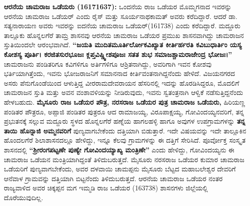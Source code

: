 \textbf{ ಆರನೆಯ ಚಾಮರಾಜ ಒಡೆಯರು (16171637): } ಒಂದನೆಯ ರಾಜ ಒಡೆಯರ ಮೊಮ್ಮಗನಾದ ಇವರನ್ನು ಆರನೆಯ ಚಾಮರಾಜ ಒಡೆಯರ್​ ಎಂದು ರೈಸ್​ ಮತ್ತು ಸೂರ್ಯನಾಥಕಾಮತ್​ ಅವರು ಕರೆದಿದ್ದಾರೆ. ಆದರೆ ಡಾ. ಸತ್ಯನಾರಾಯಣ ಅವರು ಇವರನ್ನು ಐದನೆಯ ಚಾಮರಾಜ ಒಡೆಯರ್​(161738) ಎಂದು ಕರೆದಿದ್ದಾರೆ. ಮದ್ದೂರು ತಾಲ್ಲೂಕು ಹೊನ್ನಲಗೆರೆ ತಾಮ್ರ ಶಾಸನವು ಆರನೆಯ ಚಾಮರಾಜ ಒಡೆಯರ ಪ್ರಮುಖ ಶಾಸನವಾಗಿದ್ದು ಚಾಮರಾಜನ ಸ್ತುತಿಯಿಂದಲೇ ಆರಂಭವಾಗಿದೆ. \textbf{“ಜಯತಿ ಮುದಿತಮೂರ್ತಿರ್ಲೋಕವಿಖ್ಯಾತ ಕೀರ್ತಿರ್ಹರತಿ ಕವಿಬುಧಾರ್ತಿಂ ಯಸ್ಯ ಕೋಶಸ್ಯ ಪೂರ್ತಿ। ಕರಜಿತಸುರಭೂಜಃ ಕ್ಲಪ್ತವಿಷ್ಣ್ವೀಶಪೂಜಃ ಸತತ ಶುಭ ಸಮಾಜಶ್ಚಾಮರಾಜೇಂದ್ರ ಭೋಜಃ।”} ಚಾಮರಾಜನು ಪಂಡಿತರಿಗೂ ಕವಿಗಳಿಗೂ ಅರ್ತಿಗಳಿಗೂ ಆಶ್ರಿತನಾಗಿದ್ದು, ಅವರಿಗಾಗಿ ಇವನ ಕೋಶವು ಭರ್ತಿಯಾಗಿತ್ತೆಂದು, ಇವನು ಭೋಜರಾಜನಿಗೆ ಸಮಾನನಾದ ಕೀರ್ತಿವಂತನಾಗಿದ್ದನೆಂದು ಹೇಳಿದೆ. ವಿಜಯನಗರದ ಅಸರು ಪೆನುಗೊಂಡೆಯಿಂದ ಆಳುತ್ತಿದ್ದ ವೀರರಾಮದೇವರಾಯನ ಹೆಸರಿನಲ್ಲಿ ಇದನ್ನು ಹೊರಡಿಸಿದ್ದರೂ, ಮೊದಲಿಗೆ ಚಾಮರಾಜನ ಸ್ತುತಿ ಮತ್ತು ಅವನ ವಂಶಾವಳಿಯನ್ನು ನೀಡಿರುವುದು, ಇವನು ಸ್ವತಂತ್ರನಾಗಿ ಆಳ್ವಿಕೆ ನಡೆಸುತ್ತಿದ್ದನೆಂದು ಹೇಳಬಹುದು. \textbf{ಮೈಸೂರು ರಾಜ ಒಡೆಯರ ಪೌತ್ರ, ನರಸರಾಜ ಒಡೆಯರ ಪುತ್ರ ಚಾಮರಾಜ ಒಡೆಯರು,} ಹಿರಿಯಣ್ಣ ಪಂಡಿತರ ಪೌತ್ರರೂ, ಅಪ್ಪಾಜಿ ಪಂಡಿತರ ಪುತ್ರರೂ ಆದ ರಾಮಾಜಯ್ಯ, ವಿರೂಪಾಕ್ಷಯ್ಯ, ಗೋವಿಂದಯ್ಯನವರಿಗೆ, ತನ್ನ ಪ್ರಭುತನಕ್ಕೆ ಸಲ್ಲುವ ಮದ್ದೂರು ಸ್ಥಳದ ಹೊನ್ನಲಗೆರೆ ಹಣ್ನೆಯ ಹಾಗಲಹಳ್ಳಿ ಹಾಗೂ ಅವುಗಳ ಉಪಗ್ರಾಮಗಳನ್ನು \textbf{ತನ್ನ ತಾಯಿ ಹೊನ್ನಾಜಿ ಅಮ್ಮನವರಿಗೆ} ಪುಣ್ಯವಾಗಬೇಕೆಂದು ದತ್ತಿಯಾಗಿ ಬಿಡುತ್ತಾರೆ. ಇದೇ ವಿಷಯವನ್ನು ಇದೇ ತಾಲ್ಲೂಕಿನ ಹೊಂದಲಗೆರೆ ಶಿಲಾಶಾಸನದಲ್ಲೂ ಹೇಳಿದ್ದು, ಇನ್ನೂ ಕೆಲವು ಗ್ರಾಮಗಳನ್ನು ಈ ದತ್ತಿಗೆ ಸೇರಿಸಿದೆ. ಪೂರ್ವೋಕ್ತ ಸಂಸ್ಕೃತ ಶಾಸನದಲ್ಲಿ \textbf{“ಶ‍್ರೀರಂಗಪಟ್ಟಣೇ ಪುಣ್ಯೇ ಗೋವಿಂದಯ್ಯಾಖ್ಯ ಮಂತ್ರಿಣೇ”} ಎಂದು ಹೇಳಿದ್ದು, ಗೋವಿಂದಯ್ಯನು ಈ ಚಾಮರಾಜ ಒಡೆಯನ ಮಂತ್ರಿಯಾಗಿದ್ದಂತೆ ತಿಳಿದುಬರುತ್ತದೆ. ಮೈಸೂರು ನರಸರಾಜ ಒಡೆಯರ ಕುಮಾರ ಚಾಮರಾಜ ಒಡೆಯರಿಗೆ ಪುಣ್ಯವಾಗಬೇಕೆಂದು, ಅವರ ದಳವಾಯಿ ಚಾಮಪ್ಪನು ಮೈಸೂರು ಬೆಟ್ಟದ ಮಹಾಬಲೇಶ್ವರ ದೇವರಿಗೆ ಆನೆವಾಳ ಗ್ರಾಮವನ್ನು ದತ್ತಿಯಾಗಿ ಬಿಟ್ಟನೆಂದು ತಿಳಿದುಬರುತ್ತದೆ. ಆರನೆಯ ಚಾಮರಾಜ ಒಡೆಯರ ನಂತರ ರಾಜ್ಯವಾಳಿದ ಅವರ ಚಿಕ್ಕಪ್ಪನ ಮಗ ಇಮ್ಮಡಿ ರಾಜ ಒಡೆಯರ (163738) ಶಾಸನಗಳು ಜಿಲ್ಲೆಯಲ್ಲಿ ದೊರೆಯುವುದಿಲ್ಲ.


